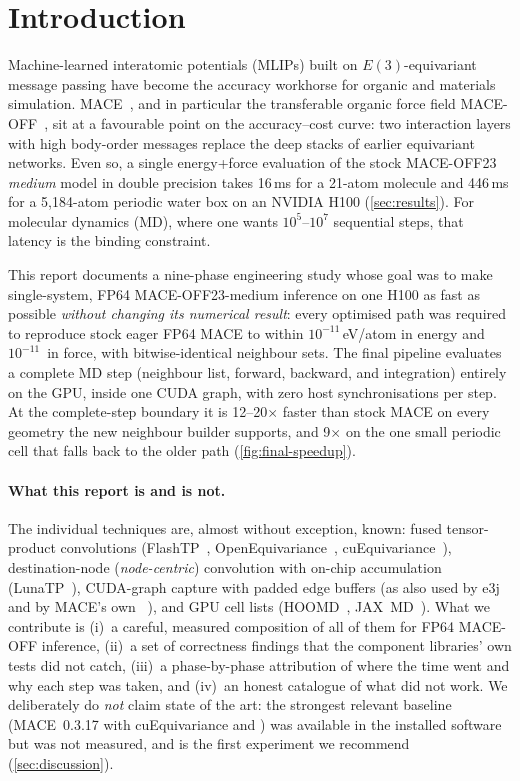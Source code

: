 \section{Introduction}
\label{sec:intro}

Machine-learned interatomic potentials (MLIPs) built on $E(3)$-equivariant message passing have become the accuracy workhorse for organic and materials simulation. MACE~\cite{batatia2022mace}, and in particular the transferable organic force field MACE-OFF~\cite{kovacs2023maceoff}, sit at a favourable point on the accuracy--cost curve: two interaction layers with high body-order messages replace the deep stacks of earlier equivariant networks. Even so, a single energy+force evaluation of the stock MACE-OFF23 \emph{medium} model in double precision takes 16\,ms for a 21-atom molecule and 446\,ms for a 5{,}184-atom periodic water box on an NVIDIA H100 (\cref{sec:results}). For molecular dynamics (MD), where one wants $10^5$--$10^7$ sequential steps, that latency is the binding constraint.

This report documents a nine-phase engineering study whose goal was to make single-system, FP64 MACE-OFF23-medium inference on one H100 as fast as possible \emph{without changing its numerical result}: every optimised path was required to reproduce stock eager FP64 MACE to within $10^{-11}$\,eV/atom in energy and $10^{-11}$\,\eVA{} in force, with bitwise-identical neighbour sets. The final pipeline evaluates a complete MD step (neighbour list, forward, backward, and integration) entirely on the GPU, inside one CUDA graph, with zero host synchronisations per step. At the complete-step boundary it is 12--20$\times$ faster than stock MACE on every geometry the new neighbour builder supports, and 9$\times$ on the one small periodic cell that falls back to the older path (\cref{fig:final-speedup}).

\paragraph{What this report is and is not.}
The individual techniques are, almost without exception, known: fused tensor-product convolutions (FlashTP~\cite{lee2025flashtp}, OpenEquivariance~\cite{bharadwaj2025oeq}, cuEquivariance~\cite{cuequivariance}), destination-node (\emph{node-centric}) convolution with on-chip accumulation (LunaTP~\cite{lunatp}), CUDA-graph capture with padded edge buffers (as also used by e3j~\cite{e3j} and by MACE's own ~\cite{mace_v0316}), and GPU cell lists (HOOMD~\cite{anderson2008hoomd}, JAX~MD~\cite{schoenholz2020jaxmd}). What we contribute is (i)~a careful, measured composition of all of them for FP64 MACE-OFF inference, (ii)~a set of correctness findings that the component libraries' own tests did not catch, (iii)~a phase-by-phase attribution of where the time went and why each step was taken, and (iv)~an honest catalogue of what did not work. We deliberately do \emph{not} claim state of the art: the strongest relevant baseline (MACE~0.3.17 with cuEquivariance and ) was available in the installed software but was not measured, and is the first experiment we recommend (\cref{sec:discussion}).


